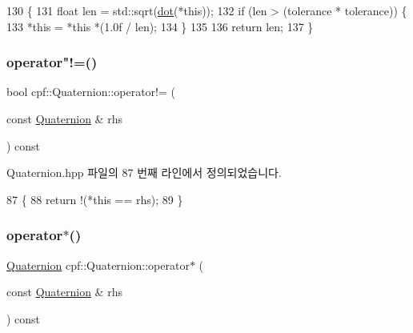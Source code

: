 \begin{DoxyCode}
130                                                   \{
131             \textcolor{keywordtype}{float} len = std::sqrt(\hyperlink{classcpf_1_1_quaternion_af5daf9d5ace6555f220e3af815c7cc5c}{dot}(*\textcolor{keyword}{this}));
132             \textcolor{keywordflow}{if} (len > (tolerance * tolerance)) \{
133                 *\textcolor{keyword}{this} = *\textcolor{keyword}{this} *(1.0f / len);
134             \}
135 
136             \textcolor{keywordflow}{return} len;
137         \}
\end{DoxyCode}
\mbox{\label{classcpf_1_1_quaternion_a9a1695acee02b317fb4140a2e63e8132}} 
\subsubsection{\texorpdfstring{operator"!=()}{operator!=()}}
{\footnotesize\ttfamily bool cpf\+::\+Quaternion\+::operator!= (\begin{DoxyParamCaption}\item[{const \hyperlink{classcpf_1_1_quaternion}{Quaternion} \&}]{rhs }\end{DoxyParamCaption}) const\hspace{0.3cm}{\ttfamily [inline]}}



Quaternion.\+hpp 파일의 87 번째 라인에서 정의되었습니다.


\begin{DoxyCode}
87                                                      \{
88             \textcolor{keywordflow}{return} !(*\textcolor{keyword}{this} == rhs);
89         \}
\end{DoxyCode}
\mbox{\label{classcpf_1_1_quaternion_a6f21995cdf9bfc8892b41f64e88c7fac}} 
\subsubsection{\texorpdfstring{operator$\ast$()}{operator*()}\hspace{0.1cm}{\footnotesize\ttfamily [1/2]}}
{\footnotesize\ttfamily \hyperlink{classcpf_1_1_quaternion}{Quaternion} cpf\+::\+Quaternion\+::operator$\ast$ (\begin{DoxyParamCaption}\item[{const \hyperlink{classcpf_1_1_quaternion}{Quaternion} \&}]{rhs }\end{DoxyParamCaption}) const\hspace{0.3cm}{\ttfamily [inline]}}




